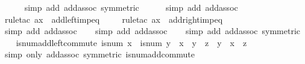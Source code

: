 \begin{isabellebody}
\ \ \ \ \isamarkupfalse%
\ {\isacharparenleft}{\kern0pt}simp\ add{\isacharcolon}{\kern0pt}\ add{\isachardot}{\kern0pt}assoc\ {\isacharbrackleft}{\kern0pt}symmetric{\isacharbrackright}{\kern0pt}{\isacharparenright}{\kern0pt}\isanewline
\ \ \ \ \isamarkupfalse%
\ {\isacharparenleft}{\kern0pt}simp\ add{\isacharcolon}{\kern0pt}\ add{\isachardot}{\kern0pt}assoc{\isacharparenright}{\kern0pt}\isanewline
\ \ \ \isamarkupfalse%
\ {\isacharparenleft}{\kern0pt}rule{\isacharunderscore}{\kern0pt}tac\ a{\isacharequal}{\kern0pt}x\ \ add{\isacharunderscore}{\kern0pt}left{\isacharunderscore}{\kern0pt}imp{\isacharunderscore}{\kern0pt}eq{\isacharparenright}{\kern0pt}\isanewline
\ \ \ \isamarkupfalse%
\ {\isacharparenleft}{\kern0pt}rule{\isacharunderscore}{\kern0pt}tac\ a{\isacharequal}{\kern0pt}x\ \ add{\isacharunderscore}{\kern0pt}right{\isacharunderscore}{\kern0pt}imp{\isacharunderscore}{\kern0pt}eq{\isacharparenright}{\kern0pt}\isanewline
\ \ \ \isamarkupfalse%
\ {\isacharparenleft}{\kern0pt}simp\ add{\isacharcolon}{\kern0pt}\ add{\isachardot}{\kern0pt}assoc{\isacharparenright}{\kern0pt}\isanewline
\ \ \isamarkupfalse%
\ {\isacharparenleft}{\kern0pt}simp\ add{\isacharcolon}{\kern0pt}\ add{\isachardot}{\kern0pt}assoc{\isacharparenright}{\kern0pt}\isanewline
\ \ \isamarkupfalse%
\ {\isacharparenleft}{\kern0pt}simp\ add{\isacharcolon}{\kern0pt}\ add{\isachardot}{\kern0pt}assoc\ {\isacharbrackleft}{\kern0pt}symmetric{\isacharbrackright}{\kern0pt}{\isacharparenright}{\kern0pt}\isanewline
\ \ \isamarkupfalse%
%
\endisatagproof
{\isafoldproof}%
%
\isadelimproof
\isanewline
%
\endisadelimproof
\isanewline
{}\isamarkupfalse%
\ is{\isacharunderscore}{\kern0pt}num{\isacharunderscore}{\kern0pt}add{\isacharunderscore}{\kern0pt}left{\isacharunderscore}{\kern0pt}commute{\isacharcolon}{\kern0pt}\ {\isachardoublequoteopen}is{\isacharunderscore}{\kern0pt}num\ x\ {\isasymLongrightarrow}\ is{\isacharunderscore}{\kern0pt}num\ y\ {\isasymLongrightarrow}\ x\ {\isacharplus}{\kern0pt}\ {\isacharparenleft}{\kern0pt}y\ {\isacharplus}{\kern0pt}\ z{\isacharparenright}{\kern0pt}\ {\isacharequal}{\kern0pt}\ y\ {\isacharplus}{\kern0pt}\ {\isacharparenleft}{\kern0pt}x\ {\isacharplus}{\kern0pt}\ z{\isacharparenright}{\kern0pt}{\isachardoublequoteclose}\isanewline
%
\isadelimproof
\ \ %
\endisadelimproof
%
\isatagproof
{}\isamarkupfalse%
\ {\isacharparenleft}{\kern0pt}simp\ only{\isacharcolon}{\kern0pt}\ add{\isachardot}{\kern0pt}assoc\ {\isacharbrackleft}{\kern0pt}symmetric{\isacharbrackright}{\kern0pt}\ is{\isacharunderscore}{\kern0pt}num{\isacharunderscore}{\kern0pt}add{\isacharunderscore}{\kern0pt}commute{\isacharparenright}{\kern0pt}%

\end{isabellebody}
